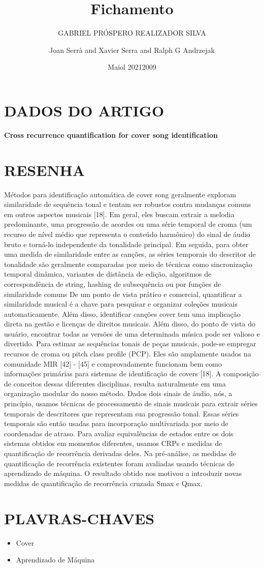\documentclass{article}
\title{Fichamento}
\author{GABRIEL PRÓSPERO REALIZADOR  SILVA}
\date{Maiol 2021}
\begin{document}
\maketitle

\section{DADOS DO ARTIGO}
\textbf{Cross recurrence quantification for cover song identification \\}
\author{Joan Serr{\`{a}} and Xavier Serra and Ralph G Andrzejak\\}
\date{2009}

\section{RESENHA}
Métodos para identificação automática de cover song geralmente exploram similaridade de sequência tonal e tentam ser robustos contra mudanças comuns em outros aspectos musicais [18]. Em geral, eles buscam extrair a melodia predominante, uma progressão de acordes ou uma série temporal de croma (um recurso de nível médio que representa o conteúdo harmônico) do sinal de áudio bruto e torná-lo independente da tonalidade principal. Em seguida, para obter uma medida de similaridade entre as canções, as séries temporais do descritor de tonalidade são geralmente comparadas por meio de técnicas como sincronização temporal dinâmica, variantes de distância de edição, algoritmos de correspondência de string, hashing de subsequência ou por funções de similaridade comuns
De um ponto de vista prático e comercial, quantificar a similaridade musical é a chave para pesquisar e organizar coleções musicais automaticamente. Além disso, identificar canções cover tem uma implicação direta na gestão e licenças de direitos musicais. Além disso, do ponto de vista do usuário, encontrar todas as versões de uma determinada música pode ser valioso e divertido. Para estimar as sequências tonais de peças musicais, pode-se empregar recursos de croma ou pitch class profile (PCP). Eles são amplamente usados ​​na comunidade MIR [42] - [45] e comprovadamente funcionam bem como informações primárias para sistemas de identificação de covers [18].
A composição de conceitos dessas diferentes disciplinas, resulta naturalmente em uma organização modular do nosso método. Dados dois sinais de áudio, nós, a princípio, usamos técnicas de processamento de sinais musicais para extrair séries temporais de descritores que representam sua progressão tonal. Essas séries temporais são então usadas para incorporação multivariada por meio de coordenadas de atraso. Para avaliar equivalências de estados entre os dois sistemas obtidos em momentos diferentes, usamos CRPs e medidas de quantificação de recorrência derivadas deles. Na pré-análise, as medidas de quantificação de recorrência existentes foram avaliadas usando técnicas de aprendizado de máquina. O resultado obtido nos motivou a introduzir novas medidas de quantificação de recorrência cruzada Smax e Qmax.
\section{PLAVRAS-CHAVES}
\begin{itemize}
    \item Cover
    \item Aprendizado de Máquina
\end{itemize}
\end{document}
